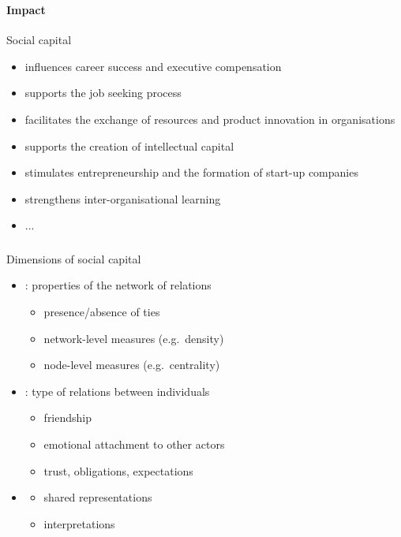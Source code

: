 \documentclass[8pt]{beamer}
\begin{document}

\begin{frame}
\frametitle{\insertsection}
\framesubtitle{Impact}

Social capital \cite{Adler2002}
\begin{itemize}
\item influences career success and executive compensation
\item supports the job seeking process
\item facilitates the exchange of resources and product innovation in organisations
\item supports the creation of intellectual capital
\item stimulates entrepreneurship and the formation of start-up companies
\item strengthens inter-organisational learning
\item ...
\end{itemize}
 

\end{frame}


\begin{frame}
\frametitle{\insertsection}

Dimensions of social capital \cite{Nahapiet1998}  

\medskip

\begin{itemize}
\item {\color{blue}{Structural}}: properties of the network of relations
    \begin{itemize}
    \item presence/absence of ties
    \item network-level measures (e.g.\ density)
    \item node-level measures (e.g.\ centrality)
    \end{itemize}

\medskip

\item {\color{blue}{Relational}}: type of relations between individuals 
    \begin{itemize}
    \item friendship
    \item emotional attachment to other actors
    \item trust, obligations, expectations
    \end{itemize}

\medskip

\item {\color{blue}{Cognitive}}
    \begin{itemize}
    \item shared representations
    \item interpretations
    \end{itemize}

\end{itemize} 

\end{frame}
\end{document}
